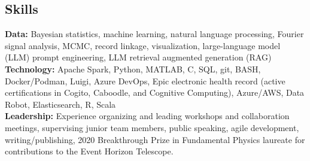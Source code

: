 \documentclass[margin,line, 11pt]{res}
\newenvironment{list2}{
  \begin{list}{$\bullet$}{%
      \setlength{\itemsep}{0in}
      \setlength{\parsep}{0in} \setlength{\parskip}{0in}
      \setlength{\topsep}{0in} \setlength{\partopsep}{0in}
      \setlength{\leftmargin}{0.2in}}}{\end{list}}
\begin{document}
\begin{resume}
\vspace*{-2mm}

\section{Skills}
\textbf{Data:} Bayesian statistics, machine learning, natural language processing, Fourier signal analysis, MCMC, record linkage, visualization, large-language model (LLM) prompt engineering, LLM retrieval augmented generation (RAG)\\
\textbf{Technology:} Apache Spark, Python, MATLAB, C, SQL, git, BASH, Docker/Podman, Luigi, Azure DevOps, Epic electronic health record (active certifications in Cogito, Caboodle, and Cognitive Computing), Azure/AWS, Data Robot, Elasticsearch, R, Scala\\
\textbf{Leadership:} Experience organizing and leading workshops and collaboration meetings, supervising junior team members, public speaking, agile development, writing/publishing, 2020 Breakthrough Prize in Fundamental Physics laureate for contributions to the Event Horizon Telescope. \\
\vspace*{-2mm}


\end{resume}
\end{document}
